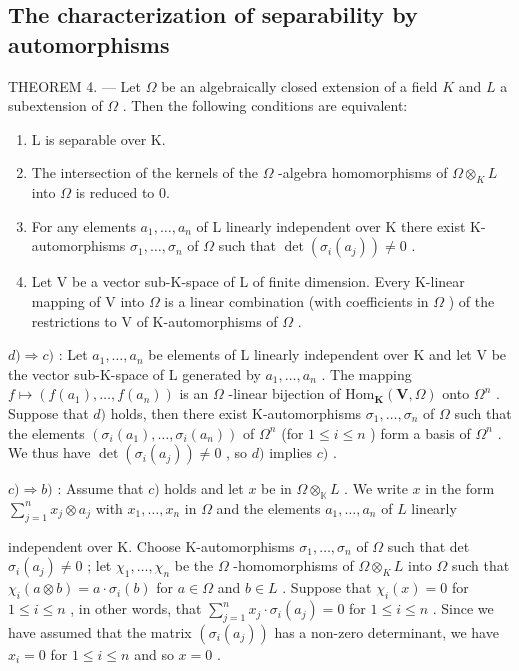 \subsection{The characterization of separability by automorphisms}

THEOREM 4. --- Let \(\Omega\) be an algebraically closed extension of a field \(K\) and \(L\) a subextension of \(\Omega\) . Then the following conditions are equivalent:

\begin{enumerate}
\def\labelenumi{\alph{enumi})}
\item
  L is separable over K.
\item
  The intersection of the kernels of the \(\Omega\) -algebra homomorphisms of \(\Omega \otimes_{K} L\) into \(\Omega\) is reduced to 0.
\item
  For any elements \(a_1, \ldots, a_n\) of L linearly independent over K there exist K-automorphisms \(\sigma_1, \ldots, \sigma_n\) of \(\Omega\) such that \(\det(\sigma_i(a_j)) \neq 0\) .
\item
  Let V be a vector sub-K-space of L of finite dimension. Every K-linear mapping of V into \(\Omega\) is a linear combination (with coefficients in \(\Omega\) ) of the restrictions to V of K-automorphisms of \(\Omega\) .
\end{enumerate}

\(d) \Rightarrow c)\) : Let \(a_1, \ldots, a_n\) be elements of L linearly independent over K and let V be the vector sub-K-space of L generated by \(a_1, \ldots, a_n\) . The mapping \(f \mapsto (f(a_1), \ldots, f(a_n))\) is an \(\Omega\) -linear bijection of \(\mathrm{Hom}_{\mathbf{K}}(\mathbf{V}, \Omega)\) onto \(\Omega^n\) . Suppose that \(d)\) holds, then there exist K-automorphisms \(\sigma_1, \ldots, \sigma_n\) of \(\Omega\) such that the elements \((\sigma_i(a_1), \ldots, \sigma_i(a_n))\) of \(\Omega^n\) (for \(1 \leqslant i \leqslant n\) ) form a basis of \(\Omega^n\) . We thus have \(\det(\sigma_i(a_j)) \neq 0\) , so \(d)\) implies \(c)\) .

\(c) \Rightarrow b)\) : Assume that \(c)\) holds and let \(x\) be in \(\Omega \otimes_{\mathbb{K}} L\) . We write \(x\) in the form \(\sum_{j=1}^{n} x_j \otimes a_j\) with \(x_1, \ldots, x_n\) in \(\Omega\) and the elements \(a_1, \ldots, a_n\) of \(L\) linearly

independent over K. Choose K-automorphisms \(\sigma_{1},\ldots,\sigma_{n}\) of \(\Omega\) such that det \(\sigma_{i}(a_{j})\neq0\) ; let \(\chi_{1},\ldots,\chi_{n}\) be the \(\Omega\) -homomorphisms of \(\Omega\otimes_{K}L\) into \(\Omega\) such that \(\chi_{i}(a\otimes b)=a\cdot\sigma_{i}(b)\) for \(a\in\Omega\) and \(b\in L\) . Suppose that \(\chi_{i}(x)=0\) for \(1\leqslant i\leqslant n\) , in other words, that \(\sum_{j=1}^{n}x_{j}\cdot\sigma_{i}(a_{j})=0\) for \(1\leqslant i\leqslant n\) . Since we have assumed that the matrix \((\sigma_{i}(a_{j}))\) has a non-zero determinant, we have \(x_{i}=0\) for \(1\leqslant i\leqslant n\) and so \(x=0\) .

